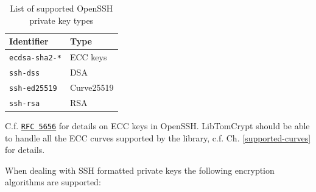 \documentclass[synpaper]{book}
\begin{document}
\begin{table}[H]
\begin{small}
\begin{tabular}{|l|l|}
\hline \textbf{Identifier}    & \textbf{Type} \\
\hline \texttt{ecdsa-sha2-*}  & ECC keys \\
\hline \texttt{ssh-dss}       & DSA \\
\hline \texttt{ssh-ed25519}   & Curve25519 \\
\hline \texttt{ssh-rsa}       & RSA \\
\hline
\end{tabular}
\end{small}
\caption{List of supported OpenSSH private key types}
\label{supported-openssh-private-key-types}
\end{table}

C.f. \href{https://datatracker.ietf.org/doc/html/rfc5656}{\texttt{RFC 5656}} for details on ECC keys
in OpenSSH.  LibTomCrypt should be able to handle all the ECC curves supported by the library,
c.f. Ch. \ref{supported-curves} for details.

When dealing with SSH formatted private keys the following encryption algorithms are supported:
\end{document}
